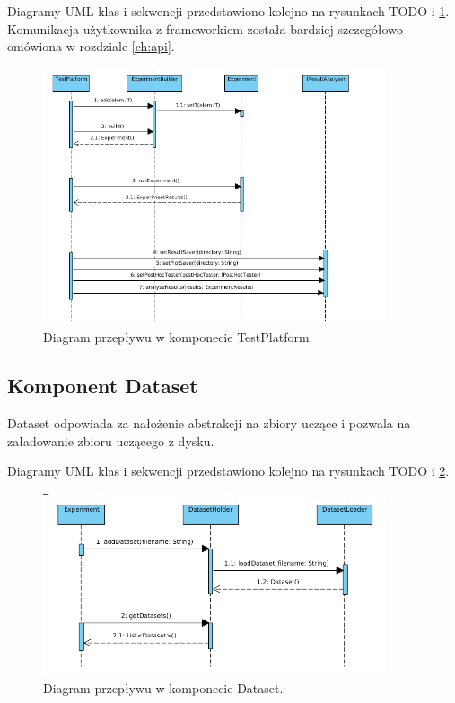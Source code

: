\documentclass[12pt]{article}
\begin{document}
Diagramy UML klas i sekwencji przedstawiono kolejno na rysunkach TODO i \ref{fig:sequenceTestPlatform}. Komunikacja użytkownika z frameworkiem została bardziej szczegółowo omówiona w rozdziale \ref{ch:api}.

\begin{figure}
\centering
	\includegraphics[width=0.9\textwidth]{img/sequenceTestPlatform.png}
	\caption{Diagram przepływu w komponecie TestPlatform.}
	\label{fig:sequenceTestPlatform}
\end{figure}



\subsection{Komponent Dataset}

Dataset odpowiada za nałożenie abstrakcji na zbiory uczące i pozwala na załadowanie zbioru uczącego z dysku. 

Diagramy UML klas i sekwencji przedstawiono kolejno na rysunkach TODO i \ref{fig:sequenceDataset}.

\begin{figure}
	\centering
	\includegraphics[width=0.9\textwidth]{img/sequenceDataset.png}
	\caption{Diagram przepływu w komponecie Dataset.}
	\label{fig:sequenceDataset}
\end{figure}
\end{document}
